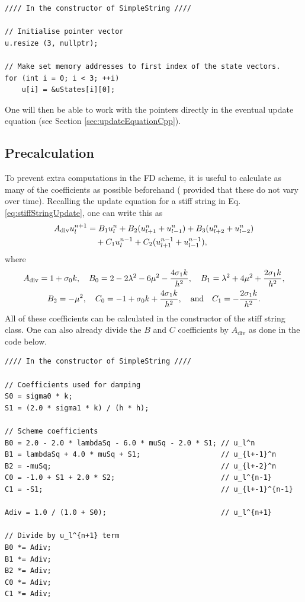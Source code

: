 \begin{lstlisting}[belowskip=-0.5\baselineskip]
//// In the constructor of SimpleString ////

// Initialise pointer vector
u.resize (3, nullptr);

// Make set memory addresses to first index of the state vectors.
for (int i = 0; i < 3; ++i)
    u[i] = &uStates[i][0];
\end{lstlisting}
One will then be able to work with the pointers directly in the eventual update equation (see Section \ref{sec:updateEquationCpp}).

\subsection{Precalculation}
To prevent extra computations in the FD scheme, it is useful to calculate as many of the coefficients as possible beforehand ( provided that these do not vary over time). Recalling the update equation for a stiff string in Eq. \eqref{eq:stiffStringUpdate}, one can write this as
\begin{equation}
    \begin{aligned}
        A_\text{div} u_l^{n+1} &= B_1 u_l^n + B_2 (u_{l+1}^n + u_{l-1}^n) + B_3(u_{l+2}^n + u_{l-2}^n) \\
        &\quad+ C_1u_l^{n-1}+ C_2(u_{l+1}^{n-1} + u_{l-1}^{n-1}),
    \end{aligned}
    \end{equation}
where
\begin{gather*}
    A_\text{div} = 1+\sigma_{0} k, \quad B_0 = 2 - 2\lambda^2 - 6\mu^2 - \frac{4\sigma_{1} k}{h^2}, \quad B_1 = \lambda^2 + 4\mu^2 + \frac{2\sigma_{1} k}{h^2},\\
    B_2 = - \mu^2, \quad C_0 = -1+\sigma_{0} k + \frac{4\sigma_{1} k}{h^2},\quad \text{and} \quad C_1 = - \frac{2\sigma_{1} k}{h^2}.
\end{gather*}
All of these coefficients can be calculated in the constructor of the stiff string class. One can also already divide the $B$ and $C$ coefficients by $A_\text{div}$ as done in the code below.
\setlstCpp
\begin{lstlisting}[]
//// In the constructor of SimpleString ////

// Coefficients used for damping
S0 = sigma0 * k;
S1 = (2.0 * sigma1 * k) / (h * h);

// Scheme coefficients
B0 = 2.0 - 2.0 * lambdaSq - 6.0 * muSq - 2.0 * S1; // u_l^n
B1 = lambdaSq + 4.0 * muSq + S1;                   // u_{l+-1}^n
B2 = -muSq;                                        // u_{l+-2}^n
C0 = -1.0 + S1 + 2.0 * S2;                         // u_l^{n-1}
C1 = -S1;                                          // u_{l+-1}^{n-1}

Adiv = 1.0 / (1.0 + S0);                           // u_l^{n+1}

// Divide by u_l^{n+1} term
B0 *= Adiv;
B1 *= Adiv;
B2 *= Adiv;
C0 *= Adiv;
C1 *= Adiv;
\end{lstlisting}

